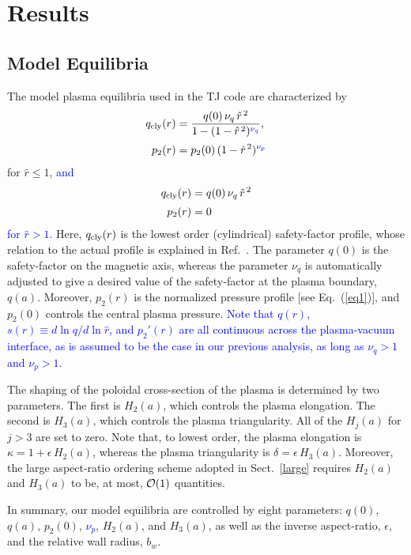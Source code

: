 \documentclass[12pt,prb,aps]{revtex4-1}
\begin{document}
\section{Results}\label{results}
\subsection{Model Equilibria}
The model plasma equilibria used in the TJ code are characterized by
\begin{align}
q_{\rm cly}(r) &= \frac{q(0)\,\nu_q\,\hat{r}^{\,2}}{1-(1-\hat{r}^{\,2})^{\textcolor{blue}{\nu_q}}},\\[0.5ex]
p_2(r)&=p_2(0)\,(1-\hat{r}^{\,2})^{\textcolor{blue}{\nu_p}}
\end{align}
for $\hat{r}\leq 1$, \textcolor{blue}{ and
\begin{align}
q_{\rm cly}(r) &= q(0)\,\nu_q\,\hat{r}^{\,2}\\[0.5ex]
p_2(r)&=0
\end{align}
for $\hat{r}>1$. }
Here, $q_{\rm cly}(r)$ is the lowest order (cylindrical) safety-factor profile, whose relation to the actual profile is explained in Ref.~. The parameter $q(0)$ is the
safety-factor on the magnetic axis, whereas the parameter $\nu_q$ is automatically adjusted to give a desired value of the safety-factor at the plasma boundary, $q(a)$.  
Moreover, $p_2(r)$ is the normalized pressure profile [see Eq.~(\ref{eq1})], and $p_2(0)$ controls the central plasma pressure. 
\textcolor{blue}{Note that $q(r)$, $s(r)\equiv d\ln q/d\ln\hat{r}$, and $p_2'(r)$ are all continuous across the plasma-vacuum interface, as is assumed to be the case in our
previous analysis,  as long as
$\nu_q>1$ and $\nu_p>1$.} 
 
 The shaping of the
poloidal cross-section of the plasma is determined by two parameters. The first is  $H_2(a)$, which controls the plasma elongation. The second is $H_3(a)$, which
controls the plasma triangularity. All of the  $H_j(a)$ for $j>3$ are set to zero.
Note that, to lowest order, the plasma elongation is $\kappa=1+\epsilon\,H_2(a)$, whereas the plasma triangularity is $\delta =\epsilon\,H_3(a)$.\cite{eql} Moreover, the large aspect-ratio ordering scheme
adopted in Sect.~\ref{large} requires $H_2(a)$ and $H_3(a)$ to be, at most, ${\cal O}(1)$ quantities. 

In summary, our model equilibria are controlled by eight parameters: $q(0)$, $q(a)$, $p_2(0)$, \textcolor{blue}{$\nu_p$}, $H_2(a)$, and $H_3(a)$, as well as the inverse aspect-ratio, $\epsilon$,
and the relative wall radius, $b_w$.  
\end{document}
